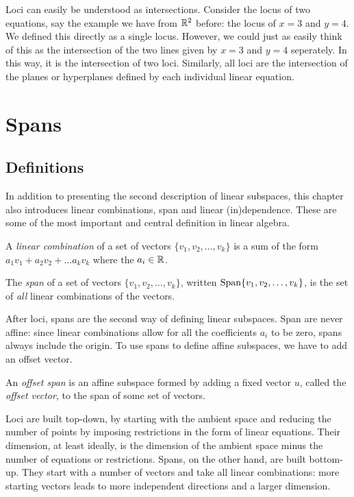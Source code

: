 \documentclass[fleqn]{report}
\begin{document}
\begin{example}
Loci can easily be understood as intersections. Consider the 
locus of two equations, say the example we have from $\mathbb{R}^2$
before: the locus of $x=3$ and $y=4$. We defined this directly
as a single locus. However, we could just as easily think of
this as the intersection of the two lines given by $x=3$ and
$y=4$ seperately. In this way, it is the intersection of two
loci. Similarly, all loci are the intersection of the planes or 
hyperplanes defined by each individual linear equation.
\end{example}

\chapter{Spans}
\label{spans}

\section{Definitions}

In addition to presenting the second description of linear
subspaces, this chapter also introduces linear combinations,
span and linear (in)dependence. These are some of the most
important and central definition in linear algebra.

\begin{defn}
A \emph{linear combination} of a set of vectors $\{v_1, v_2, \ldots,
v_k\}$ is a sum of the form $a_1 v_1 + a_2 v_2 + \ldots a_k
v_k$ where the $a_i \in \mathbb{R}$. 
\end{defn}

\begin{defn}
The \emph{span} of a set of vectors $\{v_1, v_2, \ldots, v_k\}$,
written $\mathrm{Span} \{v_1, v_2, \ldots, v_k\}$, is the set of
\emph{all} linear combinations of the vectors.
\end{defn}

After loci, spans are the second way of defining linear
subspaces. Span are never affine: since linear combinations
allow for all the coefficients $a_i$ to be zero, spans always
include the origin. To use spans to define affine subspaces,
we have to add an offset vector.

\begin{defn}
An \emph{offset span} is an affine subspace formed by adding a
fixed vector $u$, called the \emph{offset vector}, to the
span of some set of vectors.
\end{defn}

Loci are built top-down, by starting with the ambient space
and reducing the number of points by imposing restrictions in the
form of linear equations. Their dimension, at least ideally, is
the dimension of the ambient space minus the number of equations
or restrictions. Spans, on the other hand, are built bottom-up.
They start with a number of vectors and take all linear
combinations: more starting vectors leads to more independent
directions and a larger dimension.
\end{document}
